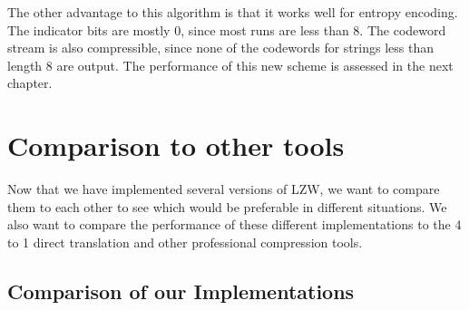 \documentclass[12pt,twoside]{reedthesis}
\begin{document}
The other advantage to this algorithm is that it works well for entropy encoding. The indicator bits are mostly 0, since most runs are less than 8. The codeword stream is also compressible, since none of the codewords for strings less than length 8 are output. The performance of this new scheme is assessed in the next chapter.

\hypertarget{comparison-to-other-tools}{%
\chapter{Comparison to other tools}\label{comparison-to-other-tools}}

Now that we have implemented several versions of LZW, we want to compare them to each other to see which would be preferable in different situations. We also want to compare the performance of these different implementations to the 4 to 1 direct translation and other professional compression tools.

\hypertarget{comparison-of-our-implementations}{%
\section{Comparison of our Implementations}\label{comparison-of-our-implementations}}
\end{document}

